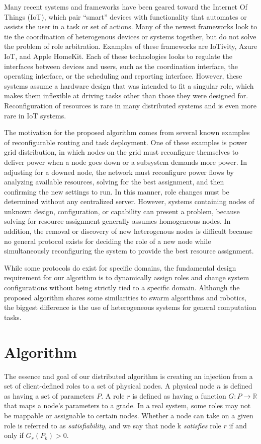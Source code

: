 \documentclass[11pt]{article}
\begin{document}
\begin{multicols}{2}
Many recent systems and frameworks have been geared toward the Internet Of Things (IoT), which pair ``smart'' devices with functionality that automates or assists the user in a task or set of actions.  Many of the newest frameworks look to tie the coordination of heterogenous devices or systems together, but do not solve the problem of role arbitration.  Examples of these frameworks are IoTivity, Azure IoT, and Apple HomeKit.  Each of these technologies looks to regulate the interfaces between devices and users, such as the coordination interface, the operating interface, or the scheduling and reporting interface. However, these systems assume a hardware design that was intended to fit a singular role, which makes them inflexible at driving tasks other than those they were designed for. Reconfiguration of resources is rare in many distributed systems and is even more rare in IoT systems.

The motivation for the proposed algorithm comes from several known examples of reconfigurable routing and task deployment.  One of these examples is power grid distribution, in which nodes on the grid must reconfigure themselves to deliver power when a node goes down or a subsystem demands more power.  In adjusting for a downed node, the network must reconfigure power flows by analyzing available resources, solving for the best assignment, and then confirming the new settings to run.  In this manner, role changes must be determined without any centralized server.  However, systems containing nodes of unknown design, configuration, or capability can present a problem, because solving for resource assignment generally assumes homogeneous nodes.  In addition, the removal or discovery of new heterogenous nodes is difficult because no general protocol exists for deciding the role of a new node while simultaneously reconfiguring the system to provide the best resource assignment.

While some protocols do exist for specific domains, the fundamental design requirement for our algorithm is to dynamically assign roles and change system configurations without being strictly tied to a specific domain. Although the proposed algorithm shares some similarities to swarm algorithms and robotics, the biggest difference is the use of heterogeneous systems for general computation tasks.

\section{Algorithm}
The essence and goal of our distributed algorithm is creating an injection from a set of client-defined roles to a set of physical nodes. A physical node $n$ is defined as having a set of parameters $P$. A role $r$ is defined as having a function $G: P \rightarrow \mathbb{R}$ that maps a node's parameters to a grade. In a real system, some roles may not be mappable or assignable to certain nodes. Whether a node can take on a given role is referred to as \textit{satisfiability}, and we say that node k \textit{satisfies} role $r$ if and only if $G_{r}(P_{k}) > 0$.


\end{multicols}
\end{document}
